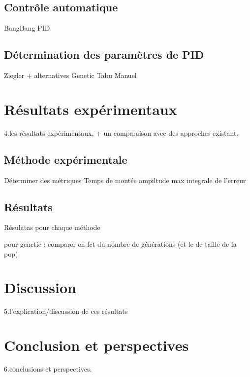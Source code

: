 \documentclass[a4paper,10pt]{report}
\begin{document}
\section{Contrôle automatique}
BangBang
PID

\section{Détermination des paramètres de PID}

Ziegler + alternatives
Genetic
Tabu
Manuel

\chapter{Résultats expérimentaux}
4.les résultats expérimentaux, + un comparaison avec des approches existant.

\section{Méthode expérimentale}
Déterminer des métriques
    Temps de montée
    ampiltude max
    integrale de l'erreur

\section{Résultats}
Résulatas pour chaque méthode

pour genetic : comparer en fct du nombre de générations (et le de taille de la pop)

\chapter{Discussion}
5.l’explication/discussion de ces résultats

\chapter{Conclusion et perspectives}
6.conclusions et perspectives.




\end{document}
